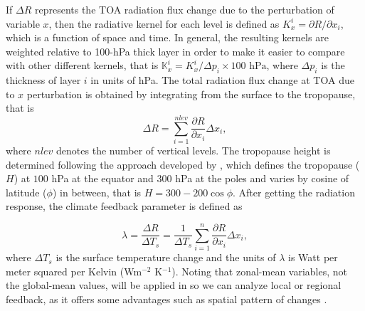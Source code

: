 If $\Delta R$ represents the TOA radiation flux change due to the perturbation of variable $x$, then the radiative kernel for each level is defined as $K^i_x = \partial R / \partial x_i$, which is a function of space and time. In general, the resulting kernels are weighted relative to 100-hPa thick layer in order to make it easier to compare with other different kernels, that is $\mathbb{K}^i_x = K^i_x / \Delta p_i \times 100\text{ hPa}$, where $\Delta p_i$ is the thickness of layer $i$ in units of hPa. The total radiation flux change at TOA due to $x$ perturbation is obtained by integrating from the surface to the tropopause, that is
\begin{equation}
\Delta R=\sum_{i=1}^{nlev} \frac{\partial R}{\partial x_i}{\Delta x_i},
\label{eq:delta_R_sum}
\end{equation}
where $nlev$ denotes the number of vertical levels. The tropopause height is determined following the approach developed by \cite{Soden2006}, which defines the tropopause ($H$) at $100$ hPa at the equator and $300$ hPa at the poles and varies by cosine of latitude ($\phi$) in between, that is $H=300-200 \cos\phi$. After getting the radiation response, the climate feedback parameter is defined as

\begin{equation}
\lambda = \frac{\Delta R}{\Delta T_s} = \frac{1}{\Delta T_s} \sum_{i=1}^{n} \frac{\partial R}{\partial x_i}\Delta x_i,
\label{eq:lambda_def}
\end{equation}
where $\Delta T_s$ is the surface temperature change and the units of $\lambda$ is Watt per meter squared per Kelvin (Wm$^{-2}$ K$^{-1}$).
Noting that zonal-mean variables, not the global-mean values, will be applied in  so we can analyze local or regional feedback, as it offers some advantages such as spatial pattern of changes \citep{Feldl2013,Feldl2017}.

